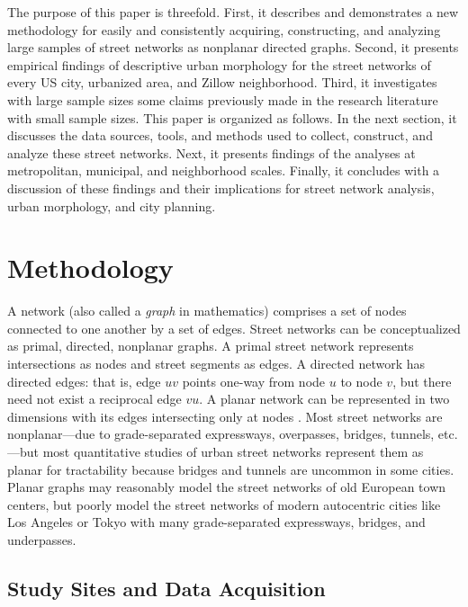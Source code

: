 \documentclass{article}
\begin{document}
The purpose of this paper is threefold. First, it describes and demonstrates a new methodology for easily and consistently acquiring, constructing, and analyzing large samples of street networks as nonplanar directed graphs. Second, it presents empirical findings of descriptive urban morphology for the street networks of every US city, urbanized area, and Zillow neighborhood. Third, it investigates with large sample sizes some claims previously made in the research literature with small sample sizes. This paper is organized as follows. In the next section, it discusses the data sources, tools, and methods used to collect, construct, and analyze these street networks. Next, it presents findings of the analyses at metropolitan, municipal, and neighborhood scales. Finally, it concludes with a discussion of these findings and their implications for street network analysis, urban morphology, and city planning.



\section{Methodology}

A network (also called a \emph{graph} in mathematics) comprises a set of nodes connected to one another by a set of edges. Street networks can be conceptualized as primal, directed, nonplanar graphs. A primal street network represents intersections as nodes and street segments as edges. A directed network has directed edges: that is, edge $uv$ points one-way from node $u$ to node $v$, but there need not exist a reciprocal edge $vu$. A planar network can be represented in two dimensions with its edges intersecting only at nodes \cite[e.g.,][]{viana_simplicity_2013, fischer_spatial_2014}. Most street networks are nonplanar---due to grade-separated expressways, overpasses, bridges, tunnels, etc.---but most quantitative studies of urban street networks represent them as planar \cite[e.g.,][]{buhl_topological_2006, cardillo_structural_2006, barthelemy_modeling_2008, masucci_random_2009, strano_urban_2013} for tractability because bridges and tunnels are uncommon in some cities. Planar graphs may reasonably model the street networks of old European town centers, but poorly model the street networks of modern autocentric cities like Los Angeles or Tokyo with many grade-separated expressways, bridges, and underpasses.

\subsection{Study Sites and Data Acquisition}
\end{document}
